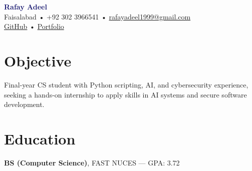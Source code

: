 \documentclass[a4paper,9.5pt]{article}
\begin{document}
\begin{center}
    {\Large \textbf{\textcolor{MidnightBlue}{Rafay Adeel}}} \\
    Faisalabad \quad • \quad +92 302 3966541 \quad • \quad \href{mailto:rafayadeel1999@gmail.com}{rafayadeel1999@gmail.com} \\
    \href{https://github.com/CodeRafay}{GitHub} \quad • \quad \href{https://coderafay.github.io/rafay-portfolio/}{Portfolio}
\end{center}

\vspace{-1mm}
\section*{Objective}
Final-year CS student with Python scripting, AI, and cybersecurity experience, seeking a hands-on internship to apply skills in AI systems and secure software development.

\vspace{-1mm}
\section*{Education}
\textbf{BS (Computer Science)}, FAST NUCES — GPA: 3.72

\vspace{-1mm}
\end{document}
